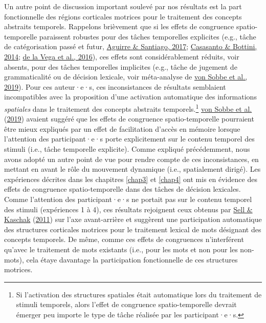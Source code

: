 \documentclass[
  a4paper,12pt,twoside,onecolumn,openright,final,oldfontcommands]{memoir}
\begin{document}
Un autre point de discussion important soulevé par nos résultats est la part fonctionnelle des régions corticales motrices pour le traitement des concepts abstraits temporels. Rappelons brièvement que si les effets de congruence spatio-temporelle paraissent robustes pour des tâches temporelles explicites (e.g., tâche de catégorisation passé et futur, \protect\hyperlink{ref-aguirre_potential_2017}{Aguirre \& Santiago, 2017}; \protect\hyperlink{ref-casasanto_spatial_2014}{Casasanto \& Bottini, 2014}; \protect\hyperlink{ref-de_la_vega_mental_2016}{de la Vega et al., 2016}), ces effets sont considérablement réduits, voir absents, pour des tâches temporelles implicites (e.g., tâche de jugement de grammaticalité ou de décision lexicale, voir méta-analyse de \protect\hyperlink{ref-von_sobbe_space-time_2019}{von Sobbe et al., 2019}). Pour ces auteur·e·s, ces inconsistances de résultats semblaient incompatibles avec la proposition d'une activation automatique des informations \emph{spatiales} dans le traitement des concepts abstraits temporels.\footnote{Si l'activation des structures spatiales était automatique lors du traitement de stimuli temporels, alors l'effet de congruence spatio-temporelle devrait émerger peu importe le type de tâche réalisée par les participant·e·s.} \protect\hyperlink{ref-von_sobbe_space-time_2019}{von Sobbe et al.} (\protect\hyperlink{ref-von_sobbe_space-time_2019}{2019}) avaient suggéré que les effets de congruence spatio-temporelle pourraient être mieux expliqués par un effet de facilitation d'accès en mémoire lorsque l'attention des participant·e·s porte explicitement sur le contenu temporel des stimuli (i.e., tâche temporelle explicite). Comme expliqué précédemment, nous avons adopté un autre point de vue pour rendre compte de ces inconsistances, en mettant en avant le rôle du mouvement dynamique (i.e., spatialement dirigé). Les expériences décrites dans les chapitres \ref{chap3} et \ref{chap4} ont mis en évidence des effets de congruence spatio-temporelle dans des tâches de décision lexicales. Comme l'attention des participant·e·s ne portait pas sur le contenu temporel des stimuli (expériences 1 à 4), ces résultats rejoignent ceux obtenus par \protect\hyperlink{ref-sell_processing_2011}{Sell \& Kaschak} (\protect\hyperlink{ref-sell_processing_2011}{2011}) sur l'axe avant-arrière et suggèrent une participation automatique des structures corticales motrices pour le traitement lexical de mots désignant des concepts temporels. De même, comme ces effets de congruences n'interférent qu'avec le traitement de mots existants (i.e., pour les mots et non pour les non-mots), cela étaye davantage la participation fonctionnelle de ces structures motrices.
\end{document}
